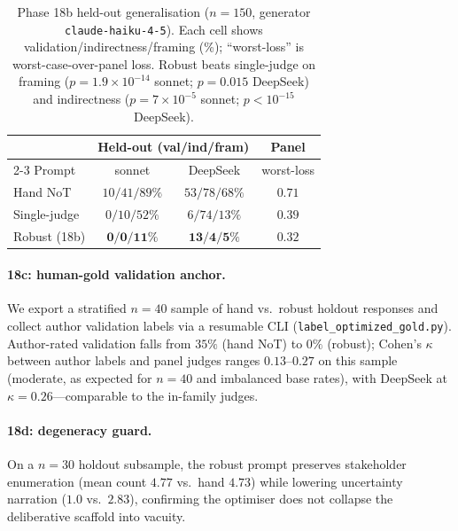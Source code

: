 \documentclass[11pt]{article}
\begin{document}
\begin{table}[t]
\centering
\small
\setlength{\tabcolsep}{4pt}
\begin{tabular}{lcc|c}
\toprule
 & \multicolumn{2}{c}{Held-out (val/ind/fram)} & Panel \\
\cmidrule(lr){2-3}
Prompt & sonnet & DeepSeek & worst-loss \\
\midrule
Hand NoT      & $10/41/89\%$ & $53/78/68\%$ & $0.71$ \\
Single-judge  & $0/10/52\%$  & $6/74/13\%$  & $0.39$ \\
Robust (18b)  & $\mathbf{0/0/11\%}$ & $\mathbf{13/4/5\%}$ & $\mathbf{0.32}$ \\
\bottomrule
\end{tabular}
\caption{Phase 18b held-out generalisation ($n{=}150$, generator \texttt{claude-haiku-4-5}). Each cell shows validation/indirectness/framing (\%); ``worst-loss'' is worst-case-over-panel loss. Robust beats single-judge on framing ($p{=}1.9{\times}10^{-14}$ sonnet; $p{=}0.015$ DeepSeek) and indirectness ($p{=}7{\times}10^{-5}$ sonnet; $p<10^{-15}$ DeepSeek).}
\label{tab:robust}
\end{table}

\paragraph{18c: human-gold validation anchor.}
We export a stratified $n{=}40$ sample of hand vs.\ robust holdout responses and collect author validation labels via a resumable CLI (\texttt{label\_optimized\_gold.py}).
Author-rated validation falls from $35\%$ (hand NoT) to $0\%$ (robust); Cohen's $\kappa$ between author labels and panel judges ranges $0.13$--$0.27$ on this sample (moderate, as expected for $n{=}40$ and imbalanced base rates), with DeepSeek at $\kappa{=}0.26$---comparable to the in-family judges.

\paragraph{18d: degeneracy guard.}
On a $n{=}30$ holdout subsample, the robust prompt preserves stakeholder enumeration (mean count $4.77$ vs.\ hand $4.73$) while lowering uncertainty narration ($1.0$ vs.\ $2.83$), confirming the optimiser does not collapse the deliberative scaffold into vacuity.
\end{document}

